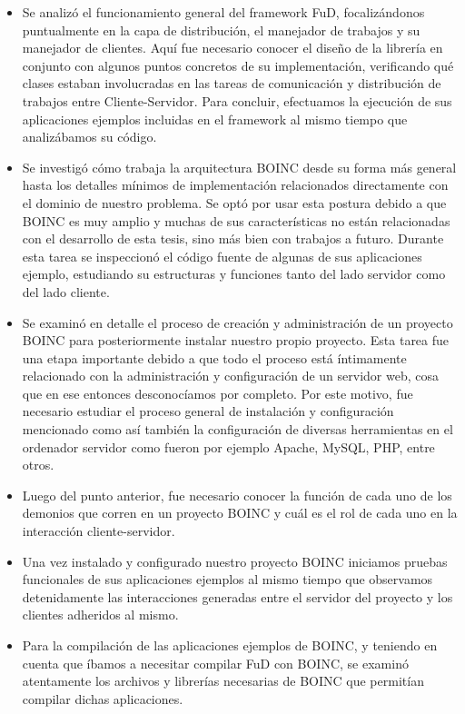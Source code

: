 \begin{itemize}
\item Se analizó el funcionamiento general del framework FuD, focalizándonos puntualmente en la capa de distribución, el manejador de trabajos y su manejador de clientes. Aquí fue necesario conocer el diseño de la librería en conjunto con algunos puntos concretos de su implementación, verificando qué clases estaban involucradas en las tareas de comunicación y distribución de trabajos entre Cliente-Servidor. Para concluir, efectuamos la ejecución de sus aplicaciones ejemplos incluidas en el framework al mismo tiempo que analizábamos su código.
\item Se investigó cómo trabaja la arquitectura BOINC desde su forma más general hasta los detalles mínimos de implementación relacionados directamente con el dominio de nuestro problema. Se optó por usar esta postura debido a que BOINC es muy amplio y muchas de sus características no están relacionadas con el desarrollo de esta tesis, sino más bien con trabajos a futuro. Durante esta tarea se inspeccionó el código fuente de algunas de sus aplicaciones ejemplo, estudiando su estructuras y funciones tanto del lado servidor como del lado cliente.
\item Se examinó en detalle el proceso de creación y administración de un proyecto BOINC para posteriormente instalar nuestro propio proyecto. Esta tarea fue una etapa importante debido a que todo el proceso está íntimamente relacionado con la administración y configuración de un servidor web, cosa que en ese entonces desconocíamos por completo. Por este motivo, fue necesario estudiar el proceso general de instalación y configuración mencionado como así también la configuración de diversas herramientas en el ordenador servidor como fueron por ejemplo Apache, MySQL, PHP, entre otros.
\item Luego del punto anterior, fue necesario conocer la función de cada uno de los demonios que corren en un proyecto BOINC y cuál es el rol de cada uno en la interacción cliente-servidor.
\item Una vez instalado y configurado nuestro proyecto BOINC iniciamos pruebas funcionales de sus aplicaciones ejemplos al mismo tiempo que observamos detenidamente las interacciones generadas entre el servidor del proyecto y los clientes adheridos al mismo.
\item Para la compilación de las aplicaciones ejemplos de BOINC, y teniendo en cuenta que íbamos a necesitar compilar FuD con BOINC, se examinó atentamente los archivos y librerías necesarias de BOINC que permitían compilar dichas aplicaciones.
\end{itemize}

